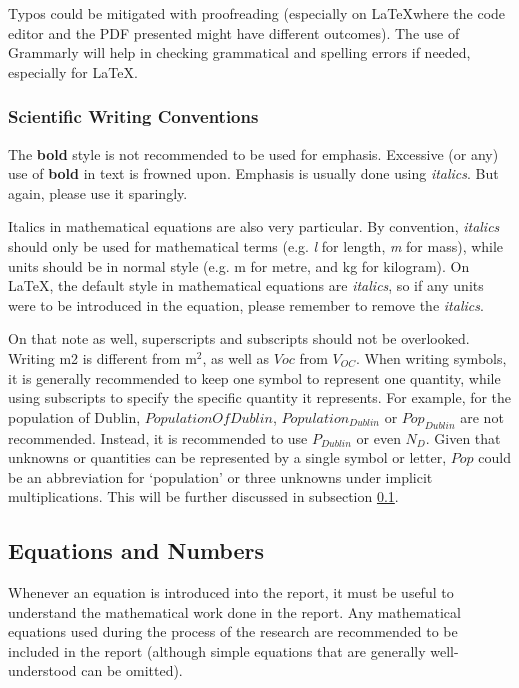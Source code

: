 Typos could be mitigated with proofreading (especially on \LaTeX where the code editor and the PDF presented might have different outcomes). The use of Grammarly will help in checking grammatical and spelling errors if needed, especially for \LaTeX. 

\subsubsection{Scientific Writing Conventions} \label{f:typography}
The \textbf{bold} style is not recommended to be used for emphasis. Excessive (or any) use of \textbf{bold} in text is frowned upon. Emphasis is usually done using \emph{italics}. But again, please use it sparingly. 

Italics in mathematical equations are also very particular. By convention, \textit{italics} should only be used for mathematical terms (e.g. \textit{l} for length, \textit{m} for mass), while units should be in normal style (e.g. m for metre, and kg for kilogram). On \LaTeX, the default style in mathematical equations are \textit{italics}, so if any units were to be introduced in the equation, please remember to remove the \textit{italics}. 

On that note as well, superscripts and subscripts should not be overlooked. Writing m2 is different from m$^2$, as well as $Voc$ from $V_{OC}$. When writing symbols, it is generally recommended to keep one symbol to represent one quantity, while using subscripts to specify the specific quantity it represents. For example, for the population of Dublin, $PopulationOfDublin$, $Population_{Dublin}$ or $Pop_{Dublin}$ are not recommended. Instead, it is recommended to use $P_{Dublin}$ or even $N_{D}$. Given that unknowns or quantities can be represented by a single symbol or letter, $Pop$ could be an abbreviation for `population' or three unknowns under implicit multiplications. This will be further discussed in subsection \ref{f:eqn}.

\subsection{Equations and Numbers} \label{f:eqn}
Whenever an equation is introduced into the report, it must be useful to understand the mathematical work done in the report. Any mathematical equations used during the process of the research are recommended to be included in the report (although simple equations that are generally well-understood can be omitted). 

